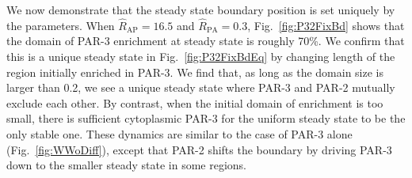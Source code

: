 \documentclass[11pt]{article}
\newcommand{\6}[1]{#1_{\text{6}}}
\newcommand{\3}[1]{#1_{\text{3}}}
\begin{document}
We now demonstrate that the steady state boundary position is set uniquely by the parameters. When $\hat R_\text{AP}=16.5$ and $\hat R_\text{PA}=0.3$, Fig.\ \ref{fig:P32FixBd} shows that the domain of PAR-3 enrichment at steady state is roughly 70\%. We confirm that this is a unique steady state in Fig.\ \ref{fig:P32FixBdEq} by changing length of the region initially enriched in PAR-3. We find that, as long as the domain size is larger than 0.2, we see a unique steady state where PAR-3 and PAR-2 mutually exclude each other. By contrast, when the initial domain of enrichment is too small, there is sufficient cytoplasmic PAR-3 for the uniform steady state to be the only stable one. These dynamics are similar to the case of PAR-3 alone (Fig.\ \ref{fig:WWoDiff}), except that PAR-2 shifts the boundary by driving PAR-3 down to the smaller steady state in some regions.
\end{document}
